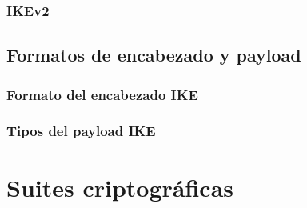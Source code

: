 \documentclass{beamer}
\begin{document}
\subsubsection{IKEv2}
\frame{\frametitle{}
  
}

\subsection{Formatos de encabezado y payload}
\subsubsection{Formato del encabezado IKE}
\subsubsection{Tipos del payload IKE}
\frame{\frametitle{}
  
}
\section{Suites criptográficas}
\subsection{}
\frame{\frametitle{}
}
\end{document}
